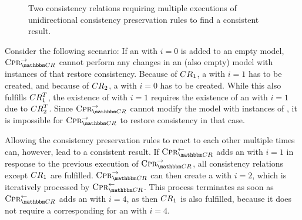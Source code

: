 \begin{figure}
    \centering
    
    \caption[Multiple execution of consistency preservation rules]{Two consistency relations requiring multiple executions of unidirectional consistency preservation rules to find a consistent result.}
    \label{fig:synchronization:multiple_unidirectional_execution}
\end{figure}

Consider the following scenario: If an  with $i = 0$ is added to an empty model, $\consistencypreservationrule{\consistencyrelationset{CR}}^{\rightarrow}$ cannot perform any changes in an (also empty) model with instances of  that restore consistency.
Because of $\consistencyrelation{CR}{1}$, a  with $i = 1$ has to be created, and because of $\consistencyrelation{CR}{2}$, a  with $i = 0$ has to be created.
While this also fulfills $\consistencyrelation{CR}{1}^T$, the existence of  with $i = 1$ requires the existence of an  with $i = 1$ due to $\consistencyrelation{CR}{2}^T$.
Since $\consistencypreservationrule{\consistencyrelationset{CR}}^{\rightarrow}$ cannot modify the model with instances of , it is impossible for $\consistencypreservationrule{\consistencyrelationset{CR}}^{\rightarrow}$ to restore consistency in that case.

Allowing the consistency preservation rules to react to each other multiple times can, however, lead to a consistent result.
If $\consistencypreservationrule{\consistencyrelationset{CR}}^{\leftarrow}$ adds an  with $i = 1$ in response to the previous execution of $\consistencypreservationrule{\consistencyrelationset{CR}}^{\rightarrow}$, all consistency relations except $\consistencyrelation{CR}{1}$ are fulfilled.
$\consistencypreservationrule{\consistencyrelationset{CR}}^{\rightarrow}$ can then create a  with $i = 2$, which is iteratively processed by $\consistencypreservationrule{\consistencyrelationset{CR}}^{\leftarrow}$.
This process terminates as soon as $\consistencypreservationrule{\consistencyrelationset{CR}}^{\leftarrow}$ adds an  with $i = 4$, as then $\consistencyrelation{CR}{1}$ is also fulfilled, because it does not require a corresponding  for an  with $i = 4$.

